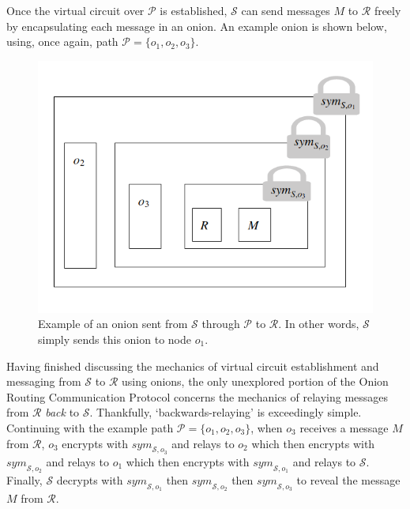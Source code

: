 \documentclass[10pt]{report}
\begin{document}
Once the virtual circuit over $\mathcal{P}$ is established, $\mathcal{S}$ can send messages $M$ to
$\mathcal{R}$ freely by encapsulating each message in an onion.  An example onion is shown below, using, once
again, path $\mathcal{P} = \{o_1, o_2, o_3\}$.

\begin{figure}[h]
    \centering
    \includegraphics[width=0.4\linewidth]{onion.png}
    \caption*{Example of an onion sent from $\mathcal{S}$ through $\mathcal{P}$ to $\mathcal{R}$.  In other
    words, $\mathcal{S}$ simply sends this onion to node $o_1$.}
\end{figure}

Having finished discussing the mechanics of virtual circuit establishment and messaging from $\mathcal{S}$
to $\mathcal{R}$ using onions, the only unexplored portion of the Onion Routing Communication Protocol concerns
the mechanics of relaying messages from $\mathcal{R}$ \textit{back} to $\mathcal{S}$.  Thankfully,
`backwards-relaying' is exceedingly simple.  Continuing with the example path $\mathcal{P} = \{o_1, o_2, o_3\}$,
when $o_3$ receives a message $M$ from $\mathcal{R}$, $o_3$ encrypts with $\mathit{sym}_{\mathcal{S},o_3}$ and
relays to $o_2$ which then encrypts with $\mathit{sym}_{\mathcal{S},o_2}$ and relays to $o_1$ which then
encrypts with $\mathit{sym}_{\mathcal{S},o_1}$ and relays to $\mathcal{S}$.  Finally, $\mathcal{S}$ decrypts
with $\mathit{sym}_{\mathcal{S},o_1}$ then $\mathit{sym}_{\mathcal{S},o_2}$ then $\mathit{sym}_{\mathcal{S},o_3}$
to reveal the message $M$ from $\mathcal{R}$.\\
\end{document}
